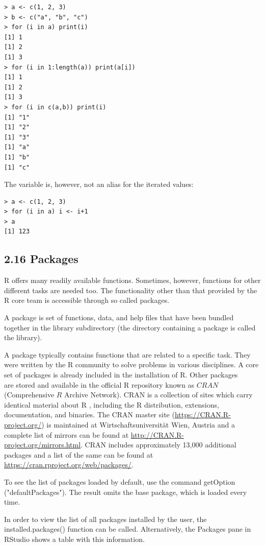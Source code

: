 \documentclass[10pt]{book}
\begin{document}
\begin{verbatim}
> a <- c(1, 2, 3)
> b <- c("a", "b", "c")
> for (i in a) print(i)
[1] 1
[1] 2
[1] 3
> for (i in 1:length(a)) print(a[i])
[1] 1
[1] 2
[1] 3
> for (i in c(a,b)) print(i)
[1] "1"
[1] "2"
[1] "3"
[1] "a"
[1] "b"
[1] "c"
\end{verbatim}

The variable is, however, not an alias for the iterated values:

\begin{verbatim}
> a <- c(1, 2, 3)
> for (i in a) i <- i+1
> a
[1] 123
\end{verbatim}

\subsection*{2.16 Packages}
R offers many readily available functions. Sometimes, however, functions for other different tasks are needed too. The functionality other than that provided by the R core team is accessible through so called packages.

A package is set of functions, data, and help files that have been bundled together in the library subdirectory (the directory containing a package is called the library).

A package typically contains functions that are related to a specific task. They were written by the R community to solve problems in various disciplines. A core set of packages is already included in the installation of R. Other packages\\
are stored and available in the official R repository known as $C R A N$ (Comprehensive $R$ Archive Network). CRAN is a collection of sites which carry identical material about R , including the R distribution, extensions, documentation, and binaries. The CRAN master site (\href{https://CRAN.R-project.org/}{https://CRAN.R-project.org/}) is maintained at Wirtschaftsuniversität Wien, Austria and a complete list of mirrors can be found at \href{http://CRAN.R-project.org/mirrors.html}{http://CRAN.R-project.org/mirrors.html}. CRAN includes approximately 13,000 additional packages and a list of the same can be found at \href{https://cran.rproject.org/web/packages/}{https://cran.rproject.org/web/packages/}.

To see the list of packages loaded by default, use the command getOption ("defaultPackages"). The result omits the base package, which is loaded every time.

In order to view the list of all packages installed by the user, the installed.packages() function can be called. Alternatively, the Packages pane in RStudio shows a table with this information.
\end{document}

